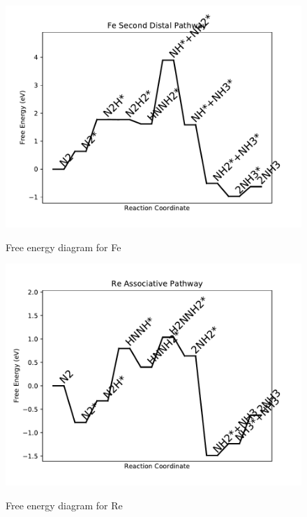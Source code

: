 \documentclass{article}
\begin{document}
\newpage
\begin{figure}
\includegraphics[width=1\linewidth]{data/plots/Fe_distal_2.pdf}
\label{fig:Fe_distal_2}
\caption{Free energy diagram for Fe}
\end{figure}

\begin{figure}
\includegraphics[width=1\linewidth]{data/plots/Re_associative.pdf}
\label{fig:Re_associative}
\caption{Free energy diagram for Re}
\end{figure}
\end{document}
